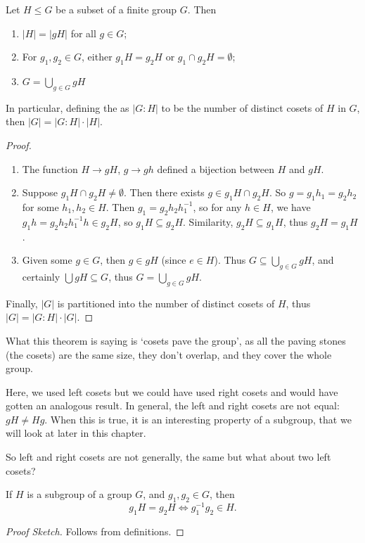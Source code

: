 \documentclass[a4paper]{scrartcl}
\begin{document}
\begin{theorem}
	Let $H \leq G$ be a subset of a finite group $G$. Then
	\begin{enumerate}[label=(\roman*)]
		\item $|H| = |gH|$ for all $g \in G$;
		\item For $g_1, g_2 \in G$, either $g_1 H = g_2 H$ or $g_1 
		\cap g_2 H = \emptyset$;
		\item $\displaystyle G = \bigcup_{g \in G} gH$
	\end{enumerate}
	In particular, defining the  as $|G : H|$ to be the number of distinct cosets of $H$ in $G$, then $|G| = |G : H| \cdot |H|$.
\end{theorem}
\begin{proof}$ $
	\begin{enumerate}[label=(\roman*)]
		\item The function $H \rightarrow gH$, $g \rightarrow gh$ defined a bijection between $H$ and $gH$.
		\item Suppose $g_1 H \cap g_2 H \neq \emptyset$. Then there exists $g \in g_1 H \cap g_2 H$. So $g = g_1 h_1 = g_2 h_2$ for some $h_1, h_2 \in H$. Then $g_1 = g_2 h_2 h_1^{-1}$, so for any $h \in H$, we have $g_1 h = g_2 h_2 h_1^{-1} h \in g_2 H$, so $g_1 H \subseteq g_2 H$. Similarity, $g_2 H \subseteq g_1 H$, thus $g_2 H = g_1 H$.
		\item Given some $g \in G$, then $g \in gH$ (since $e \in H$). Thus $G \subseteq \bigcup_{g \in G} gH$, and certainly $\bigcup gH \subseteq G$, thus $G = \bigcup_{g \in G} gH$.
	\end{enumerate}
	Finally, $|G|$ is partitioned into the number of distinct cosets of $H$, thus $|G| = |G:H|\cdot |G|$.
\end{proof}

What this theorem is saying is `cosets pave the group', as all the paving stones (the cosets) are the same size, they don't overlap, and they cover the whole group.

Here, we used left cosets but we could have used right cosets and would have gotten an analogous result. In general, the left and right cosets are not equal: $gH \neq Hg$. When this is true, it is an interesting property of a subgroup, that we will look at later in this chapter. 

So left and right cosets are not generally, the same but what about two left cosets?

\begin{proposition}
	If $H$ is a subgroup of a group $G$, and $g_1, g_2 \in G$, then
	$$
	g_1 H = g_2H \iff g_1^{-1} g_2 \in H.
	$$
\end{proposition}
\begin{proof}[Proof Sketch]
	Follows from definitions.
\end{proof}
\end{document}
